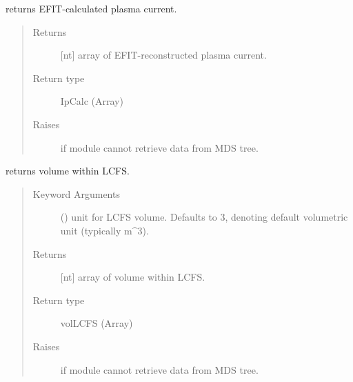 \documentclass[letterpaper,10pt,english]{sphinxmanual}
\begin{document}
\begin{fulllineitems}
\begin{fulllineitems}
\label{\detokenize{eqtools:eqtools.NSTXEFIT.NSTXEFITTree.getIpCalc}}
returns EFIT-calculated plasma current.
\begin{quote}\begin{description}
\item[{Returns}] \leavevmode
{[}nt{]} array of EFIT-reconstructed plasma current.

\item[{Return type}] \leavevmode
IpCalc (Array)

\item[{Raises}] \leavevmode
{} \textendash{} if module cannot retrieve data from MDS tree.

\end{description}\end{quote}

\end{fulllineitems}


\begin{fulllineitems}
\label{\detokenize{eqtools:eqtools.NSTXEFIT.NSTXEFITTree.getVolLCFS}}
returns volume within LCFS.
\begin{quote}\begin{description}
\item[{Keyword Arguments}] \leavevmode
{} () \textendash{} unit for LCFS volume.  Defaults to 3,
denoting default volumetric unit (typically m\textasciicircum{}3).

\item[{Returns}] \leavevmode
{[}nt{]} array of volume within LCFS.

\item[{Return type}] \leavevmode
volLCFS (Array)

\item[{Raises}] \leavevmode
{} \textendash{} if module cannot retrieve data from MDS tree.


\end{description}
\end{quote}
\end{fulllineitems}
\end{fulllineitems}
\end{document}
